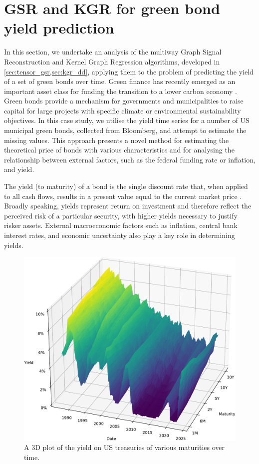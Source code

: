 
\newpage 

\section{GSR and KGR for green bond yield prediction}

\label{sec:green_bonds}

In this section, we undertake an analysis of the multiway Graph Signal Reconstruction and Kernel Graph Regression algorithms, developed in \cref{sec:tensor_gsr,sec:kgr_dd}, applying them to the problem of predicting the yield of a set of green bonds over time. Green finance has recently emerged as an important asset class for funding the transition to a lower carbon economy \citep{Peters2022}. Green bonds provide a mechanism for governments and municipalities to raise capital for large projects with specific climate or environmental sustainability objectives. In this case study, we utilise the yield time series for a number of US municipal green bonds, collected from Bloomberg, and attempt to estimate the missing values. This approach presents a novel method for estimating the theoretical price of bonds with various characteristics and for analysing the relationship between external factors, such as the federal funding rate or inflation, and yield. 

The yield (to maturity) of a bond is the single discount rate that, when applied to all cash flows, results in a present value equal to the current market price \citep{Hull2009}. Broadly speaking, yields represent return on investment and therefore reflect the perceived risk of a particular security, with higher yields necessary to justify risker assets. External macroeconomic factors such as inflation, central bank interest rates, and economic uncertainty also play a key role in determining yields. 

\begin{figure}[b] 
    \begin{center}
        \includegraphics[width=0.75\linewidth]{Figures/fed_rates.pdf}
    \end{center}
   \caption[3D plot of the yield on US treasuries of various maturities over time]{A 3D plot of the yield on US treasuries of various maturities over time. } 
    \label{fig:US_yield_curve} 
\end{figure} 

